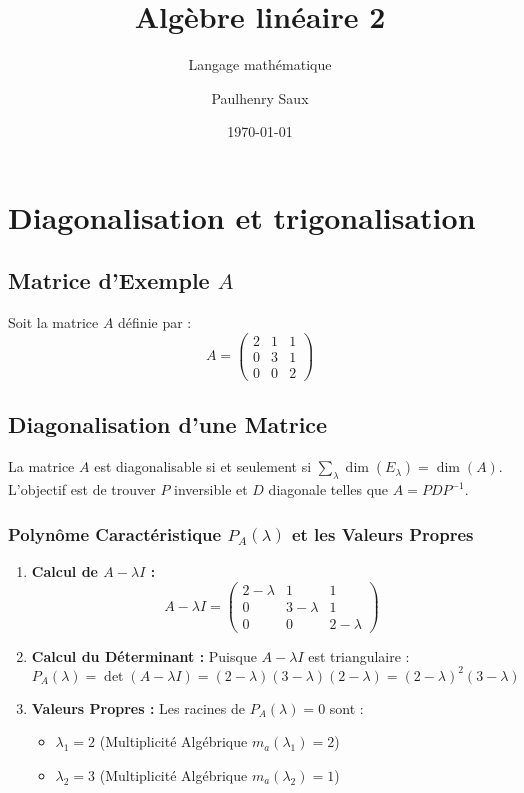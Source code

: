 \documentclass[french]{yLectureNote}
\title{Algèbre linéaire 2}
\subtitle{Langage mathématique}
\author{Paulhenry Saux}
\date{\today}
\begin{document}
\setcounter{chapter}{3}
\chapter{Diagonalisation et trigonalisation}

\section{Matrice d'Exemple $A$}

Soit la matrice $A$ définie par :
$$A = \begin{pmatrix} 2 & 1 & 1 \\ 0 & 3 & 1 \\ 0 & 0 & 2 \end{pmatrix}$$

\section{Diagonalisation d'une Matrice}

La matrice $A$ est diagonalisable si et seulement si $\sum_{\lambda} \dim(E_\lambda) = \dim(A)$. L'objectif est de trouver $P$ inversible et $D$ diagonale telles que $A = P D P^{-1}$.

\subsection{Polynôme Caractéristique $P_A(\lambda)$ et les Valeurs Propres}
\begin{enumerate}
    \item \textbf{Calcul de $A - \lambda I$ :}
    $$A - \lambda I = \begin{pmatrix} 2 - \lambda & 1 & 1 \\ 0 & 3 - \lambda & 1 \\ 0 & 0 & 2 - \lambda \end{pmatrix}$$

    \item \textbf{Calcul du Déterminant :} Puisque $A - \lambda I$ est triangulaire :
    $$P_A(\lambda) = \det(A - \lambda I) = (2 - \lambda)(3 - \lambda)(2 - \lambda) = (2 - \lambda)^2 (3 - \lambda)$$

    \item \textbf{Valeurs Propres :} Les racines de $P_A(\lambda) = 0$ sont :
    \begin{itemize}
        \item $\lambda_1 = 2$ (Multiplicité Algébrique $m_a(\lambda_1) = 2$)
        \item $\lambda_2 = 3$ (Multiplicité Algébrique $m_a(\lambda_2) = 1$)
    \end{itemize}
\end{enumerate}
\end{document}
